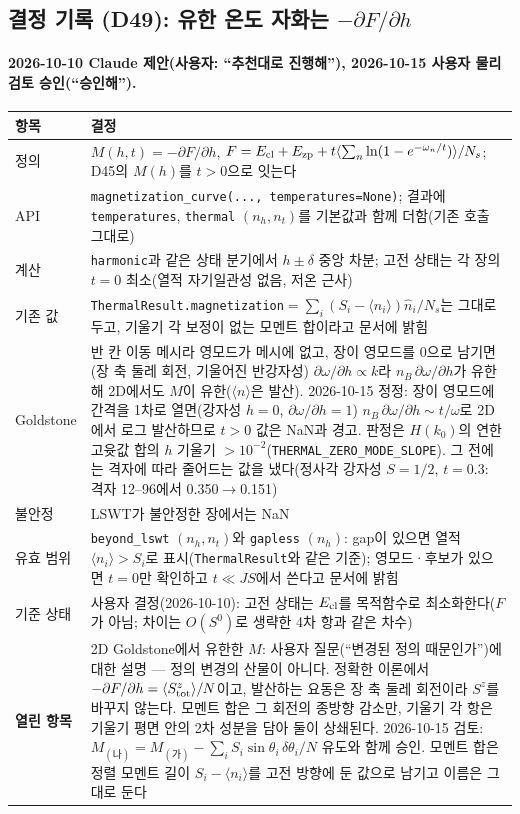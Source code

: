 \subsection{결정 기록 (D49): 유한 온도 자화는 $-\partial F/\partial h$}\label{decisions-d49-thermal-magnetization}
\begingroup%
  \framesubtitle{2026-10-10 Claude 제안(사용자: ``추천대로 진행해''), 2026-10-15 사용자 물리 검토 승인(``승인해'').}
  \small\renewcommand{\arraystretch}{1.12}
  \begin{tabularx}{\textwidth}{@{}P{3.0cm}Y@{}}
    \toprule
    항목 & 결정 \\
    \midrule
    정의 & $M(h,t)=-\partial F/\partial h$, $F=E_{\rm cl}+E_{\rm zp}+t\langle\sum_n\ln(1-e^{-\omega_n/t})\rangle/N_s$; D45의 $M(h)$를 $t>0$으로 잇는다 \\
    API & \texttt{magnetization\_curve(..., temperatures=None)}; 결과에 \texttt{temperatures}, \texttt{thermal} $(n_h, n_t)$를 기본값과 함께 더함(기존 호출 그대로) \\
    계산 & \texttt{harmonic}과 같은 상태 분기에서 $h\pm\delta$ 중앙 차분; 고전 상태는 각 장의 $t=0$ 최소(열적 자기일관성 없음, 저온 근사) \\
    기존 값 & \texttt{ThermalResult.magnetization}$=\sum_i(S_i-\langle n_i\rangle)\hat n_i/N_s$는 그대로 두고, 기울기 각 보정이 없는 모멘트 합이라고 문서에 밝힘 \\
    Goldstone & 반 칸 이동 메시라 영모드가 메시에 없고, 장이 영모드를 0으로 남기면(장 축 둘레 회전, 기울어진 반강자성) $\partial\omega/\partial h\propto k$라 $n_B\,\partial\omega/\partial h$가 유한해 2D에서도 $M$이 유한($\langle n\rangle$은 발산). 2026-10-15 정정: 장이 영모드에 간격을 1차로 열면(강자성 $h=0$, $\partial\omega/\partial h=1$) $n_B\,\partial\omega/\partial h\sim t/\omega$로 2D에서 로그 발산하므로 $t>0$ 값은 NaN과 경고. 판정은 $H(k_0)$의 연한 고윳값 합의 $h$ 기울기 $>10^{-2}$(\texttt{THERMAL\_ZERO\_MODE\_SLOPE}). 그 전에는 격자에 따라 줄어드는 값을 냈다(정사각 강자성 $S=1/2$, $t=0.3$: 격자 12--96에서 0.350$\to$0.151) \\
    불안정 & LSWT가 불안정한 장에서는 NaN \\
    \midrule
    유효 범위 & \texttt{beyond\_lswt} $(n_h,n_t)$와 \texttt{gapless} $(n_h)$: gap이 있으면 열적 $\langle n_i\rangle>S_i$로 표시(\texttt{ThermalResult}와 같은 기준); 영모드·후보가 있으면 $t=0$만 확인하고 $t\ll JS$에서 쓴다고 문서에 밝힘 \\
    기준 상태 & 사용자 결정(2026-10-10): 고전 상태는 $E_{\rm cl}$를 목적함수로 최소화한다($F$가 아님; 차이는 $O(S^0)$로 생략한 4차 항과 같은 차수) \\
    \textbf{열린 항목} & 2D Goldstone에서 유한한 $M$: 사용자 질문(``변경된 정의 때문인가'')에 대한 설명 — 정의 변경의 산물이 아니다. 정확한 이론에서 $-\partial F/\partial h=\langle S^z_{\rm tot}\rangle/N$이고, 발산하는 요동은 장 축 둘레 회전이라 $S^z$를 바꾸지 않는다. 모멘트 합은 그 회전의 종방향 감소만, 기울기 각 항은 기울기 평면 안의 2차 성분을 담아 둘이 상쇄된다. 2026-10-15 검토: $M_{(나)}=M_{(가)}-\sum_iS_i\sin\theta_i\,\delta\theta_i/N$ 유도와 함께 승인. 모멘트 합은 정렬 모멘트 길이 $S_i-\langle n_i\rangle$를 고전 방향에 둔 값으로 남기고 이름은 그대로 둔다 \\
    \bottomrule
  \end{tabularx}
